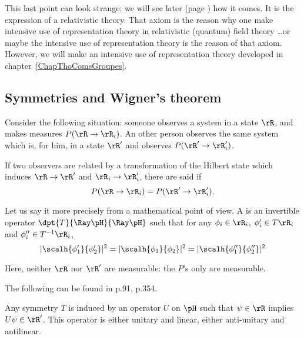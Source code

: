 This last point can look strange; we will see later (page \pageref{pg:poincare_act}) how it comes. It is the expression of a relativistic theory. That axiom is the reason why one make intensive use of representation theory in relativistic (quantum) field theory \ldots or maybe the intensive use of representation theory is the reason of that axiom. However, we will make an intensive use of representation theory developed in chapter~\ref{ChapThoComsGroupes}.

\subsection{Symmetries and Wigner's theorem}

Consider the following situation: someone observes a system in a state $\rR$, and makes measures $P(\rR\to\rR_i)$. An other person observes the same system which is, for him, in a state $\rR'$ and observes $P(\rR'\to\rR'_i)$.

If two observers are related by a transformation of the Hilbert state which induces $\rR\to\rR'$ and $\rR_i\to\rR_i'$, there are said  if
\begin{equation}\label{eq:sym_isom}
	P(\rR\to\rR_i)=P(\rR'\to\rR'_i).
\end{equation}

Let us say it more precisely from a mathematical point of view. A  is an invertible operator $\dpt{T}{\Ray\pH}{\Ray\pH}$ such that for any $\phi_i\in\rR_i$, $\phi_i'\in T\rR_i$ and $\phi''_i\in T^{-1}\rR_i$,
\begin{equation}\label{eq:}
	|\scalh{\phi'_1}{\phi'_2}|^2=|\scalh{\phi_1}{\phi_2}|^2=|\scalh{\phi''_1}{\phi''_2}|^2
\end{equation}


\begin{remark}
	Here, neither $\rR$ nor $\rR'$ are measurable: the $P$'s only are measurable.
\end{remark}

The following can be found in  \cite{Weinberg} p.91, \cite{Sternberg} p.354.
\begin{theorem}[Wigner]\label{tho:Wigner}
	Any symmetry $T$ is induced by an operator $U$ on $\pH$ such that $\psi\in\rR$ implies $U\psi\in\rR'$. This operator is either unitary and linear, either anti-unitary and antilinear.
\end{theorem}

